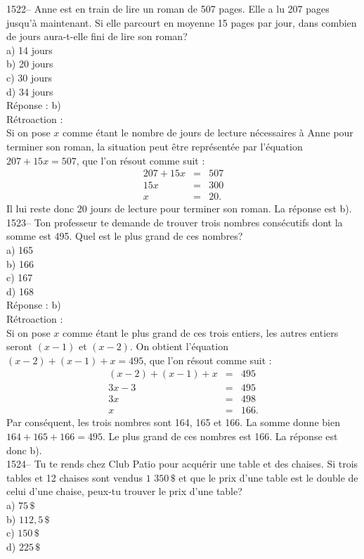 1522-- Anne est en train de lire un roman de 507 pages. Elle a lu 207
pages jusqu'\`a maintenant. Si elle parcourt en moyenne 15 pages par
jour, dans combien de jours aura-t-elle fini de lire son roman?\\
a) 14 jours\\
b) 20 jours\\
c) 30 jours\\
d) 34 jours\\

R\'eponse : b)\\

R\'etroaction :\\
Si on pose $x$ comme \'etant le nombre de jours de lecture
n\'ecessaires \`a Anne pour terminer son roman, la situation peut
\^etre repr\'esent\'ee par l'\'equation $207+15x=507$, que l'on
r\'esout comme suit :
\begin{eqnarray*}
207+15x&=&507 \\ 15x&=& 300  \\ x&=&20.
\end{eqnarray*}
Il lui reste donc 20 jours de lecture pour terminer son roman. La r\'eponse
est b).\\

1523-- Ton professeur te demande de trouver trois nombres
cons\'ecutifs dont
la somme est 495. Quel est le plus grand de ces nombres?\\
a) 165\\
b) 166\\
c) 167\\
d) 168\\

R\'eponse : b)\\

R\'etroaction :\\
Si on pose $x$ comme \'etant le plus grand de ces trois entiers, les
autres entiers seront $(x-1)$ et $(x-2)$. On obtient l'\'equation
$(x-2)+(x-1)+x=495$, que l'on r\'esout comme suit :
\begin{eqnarray*}
(x-2)+(x-1)+x&=&495 \\ 3x-3&=&495 \\ 3x&=&498 \\ x&=&166.
\end{eqnarray*}
Par cons\'equent, les trois nombres sont 164, 165 et 166. La somme
donne bien
$164+165+166=495$. Le plus grand de ces nombres est 166. La r\'eponse est
donc b).\\

1524-- Tu te rends chez Club Patio pour acqu\'erir une table et des
chaises. Si trois tables et 12 chaises sont vendus $ {\textrm{1
350}}\,\$$ et que le prix d'une table est le double de celui d'une
chaise, peux-tu trouver le prix
d'une table?\\
a) $75\,\$$\\
b) $112,5\,\$$\\
c) $150\,\$$\\
d) $225\,\$$\\

